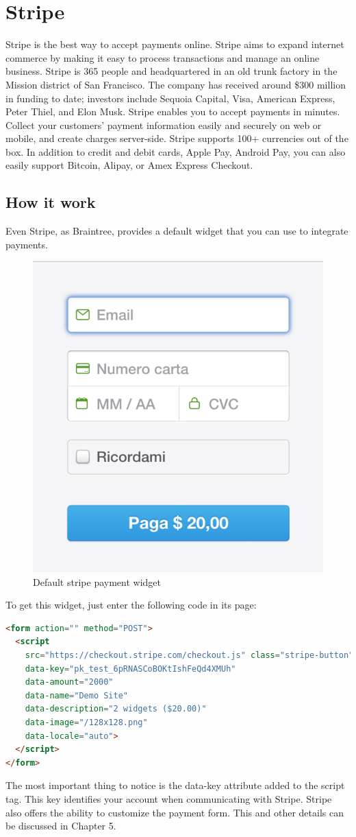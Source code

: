 \section{Stripe}
\label{sec:stripe}
Stripe is the best way to accept payments online. Stripe aims to expand internet commerce by making it easy to process transactions and manage an online business.
\newline
Stripe is 365 people and headquartered in an old trunk factory in the Mission district of San Francisco. The company has received around \$300 million in funding to date; investors include Sequoia Capital, Visa, American Express, Peter Thiel, and Elon Musk. Stripe enables you to accept payments in minutes. Collect your customers’ payment information easily and securely on web or mobile, and create charges server-side. Stripe supports 100+ currencies out of the box. In addition to credit and debit cards, Apple Pay, Android Pay, you can also easily support Bitcoin, Alipay, or Amex Express Checkout.
\subsection{How it work}
Even Stripe, as Braintree, provides a default widget that you can use to integrate payments.
\begin{figure}[htb]
  \centering
  \includegraphics[width=0.5\linewidth]{images/chapter2/stripe-drop.png}\hfill
  \caption[Default stripe payment widget]{Default stripe payment widget}
\label{fig:stripe_default_ui}
\end{figure}
To get this widget, just enter the following code in its page:
\begin{lstlisting}[language=html]
<form action="" method="POST">
  <script
    src="https://checkout.stripe.com/checkout.js" class="stripe-button"
    data-key="pk_test_6pRNASCoBOKtIshFeQd4XMUh"
    data-amount="2000"
    data-name="Demo Site"
    data-description="2 widgets ($20.00)"
    data-image="/128x128.png"
    data-locale="auto">
  </script>
</form>
\end{lstlisting}
The most important thing to notice is the data-key attribute added to the script tag. This key identifies your account when communicating with Stripe.
\newline
Stripe also offers the ability to customize the payment form. This and other details can be discussed in Chapter 5.
